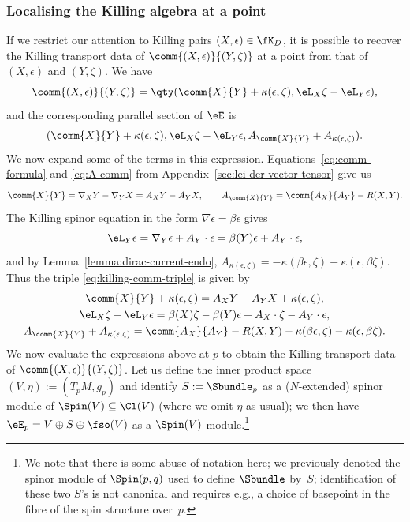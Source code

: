 \subsubsection{Localising the Killing algebra at a point}

If we restrict our attention to Killing pairs $(X,\epsilon)\in\fK_D$, it is possible to recover the Killing transport data of $\comm{(X,\epsilon)}{(Y,\zeta)}$ at a point from that of $(X,\epsilon)$ and $(Y,\zeta)$. We have
\[
	\comm{(X,\epsilon)}{(Y,\zeta)} = \qty(\comm{X}{Y} + \kappa(\epsilon,\zeta),\eL_X\zeta - \eL_Y\epsilon),
\]
and the corresponding parallel section of $\eE$ is
\begin{equation}\label{eq:killing-comm-triple}
	(\comm{X}{Y} + \kappa(\epsilon,\zeta),\eL_X\zeta - \eL_Y\epsilon,A_{\comm{X}{Y}} + A_{\kappa(\epsilon,\zeta)}).
\end{equation}
We now expand some of the terms in this expression. Equations~\eqref{eq:comm-formula} and \eqref{eq:A-comm} from Appendix~\ref{sec:lei-der-vector-tensor} give us
\[
	\comm{X}{Y} = \nabla_X Y - \nabla_Y X = A_X Y - A_Y X,\qquad
	A_{\comm{X}{Y}} = \comm{A_X}{A_Y} - R(X,Y).
\]
The Killing spinor equation in the form $\nabla \epsilon = \beta\epsilon$ gives
\[
	\eL_Y\epsilon = \nabla_Y\epsilon + A_Y\cdot\epsilon = \beta(Y)\epsilon + A_Y\cdot\epsilon,
\]
and by Lemma~\ref{lemma:dirac-current-endo},
$
	A_{\kappa(\epsilon,\zeta)} = - \kappa(\beta\epsilon,\zeta) - \kappa(\epsilon,\beta\zeta)$.
Thus the triple \eqref{eq:killing-comm-triple} is given by
\begin{gather*}
	\comm{X}{Y} + \kappa(\epsilon,\zeta) = A_X Y - A_Y X + \kappa(\epsilon,\zeta),\\
	\eL_X\zeta - \eL_Y\epsilon = \beta(X)\zeta - \beta(Y)\epsilon + A_X\cdot\zeta - A_Y\cdot\epsilon,\\
	A_{\comm{X}{Y}} + A_{\kappa(\epsilon,\zeta)} = \comm{A_X}{A_Y} - R(X,Y) - \kappa(\beta\epsilon,\zeta) - \kappa(\epsilon,\beta\zeta).
\end{gather*}
We now evaluate the expressions above at $p$ to obtain the Killing transport data of $\comm{(X,\epsilon)}{(Y,\zeta)}$. Let us define the inner product space $(V,\eta):=(T_pM,g_p)$ and identify $S:=\Sbundle_p$ as a ($N$-extended) spinor module of $\Spin(V)\subseteq\Cl(V)$ (where we omit $\eta$ as usual); we then have $\eE_p = V\oplus S\oplus\fso(V)$ as a $\Spin(V)$-module.\footnote{We note that there is some abuse of notation here; we previously denoted the spinor module of $\Spin(p,q)$ used to define $\Sbundle$ by~$S$; identification of these two $S$'s is not canonical and requires e.g., a choice of basepoint in the fibre of the spin structure over~$p$.}
